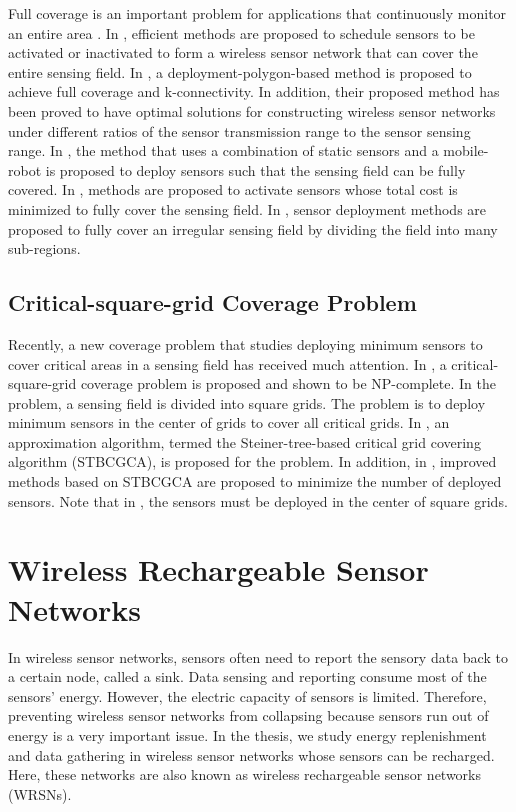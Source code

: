 Full coverage is an important problem for applications that
continuously monitor an entire area \cite{4509663,6503177}. In
\cite{5434406}, efficient methods are proposed to schedule sensors
to be activated or inactivated to form a wireless sensor network
that can cover the entire sensing field. In
\cite{Bai:2006:DWS:1132905.1132921,Bai:2008:COD:1374618.1374672}, a
deployment-polygon-based method is proposed to achieve full coverage
and k-connectivity. In addition, their proposed method has been
proved to have optimal solutions for constructing wireless sensor
networks under different ratios of the sensor transmission range to
the sensor sensing range. In \cite{4703226}, the method that uses a
combination of static sensors and a mobile-robot is proposed to
deploy sensors such that the sensing field can be fully covered. In
\cite{Chakrabarty02gridcoverage}, methods are proposed to activate
sensors whose total cost is minimized to fully cover the sensing
field. In \cite{1509645}, sensor deployment methods are proposed to
fully cover an irregular sensing field by dividing the field into
many sub-regions.

\subsection{Critical-square-grid Coverage Problem}

Recently, a new coverage problem that studies deploying minimum
sensors to cover critical areas in a sensing field has received much
attention. In \cite{Ke:2011:CCP:1994019.1994333}, a
critical-square-grid coverage problem is proposed and shown to be
NP-complete. In the problem, a sensing field is divided into square
grids. The problem is to deploy minimum sensors in the center of
grids to cover all critical grids. In \cite{5719526}, an
approximation algorithm, termed the Steiner-tree-based critical grid
covering algorithm (STBCGCA), is proposed for the problem. In
addition, in \cite{enhancedSTBCGCA}, improved methods based on
STBCGCA are proposed to minimize the number of deployed sensors.
Note that in \cite{5719526,enhancedSTBCGCA}, the sensors must be
deployed in the center of square grids.

\section{Wireless Rechargeable Sensor Networks}

In wireless sensor networks, sensors often need to report the
sensory data back to a certain node, called a sink. Data sensing and
reporting consume most of the sensors' energy. However, the electric
capacity of sensors is limited. Therefore, preventing wireless
sensor networks from collapsing because sensors run out of energy is
a very important issue. In the thesis, we study energy
replenishment and data gathering in wireless sensor networks whose
sensors can be recharged. Here, these networks are also known as
wireless rechargeable sensor networks (WRSNs).



